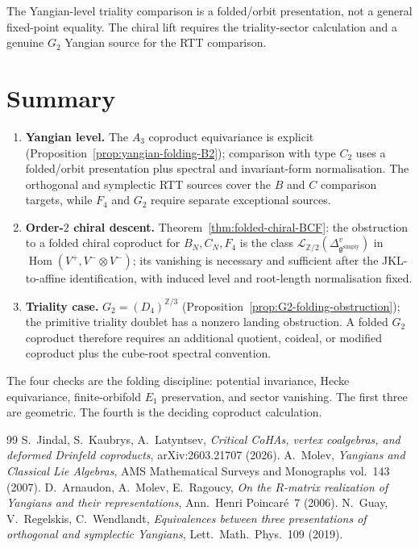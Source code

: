 \documentclass[11pt]{amsart}
\theoremstyle{definition}
\theoremstyle{remark}
\providecommand{\fg}{\mathfrak{g}}
\begin{document}
The Yangian-level triality comparison is a folded/orbit presentation,
not a general fixed-point equality. The chiral lift requires the
triality-sector calculation and a genuine $G_2$ Yangian source for
the RTT comparison.

\section{Summary}
\label{sec:summary-folding}

\begin{enumerate}[label=\textup{(\arabic*)}]
\item \textbf{Yangian level.} The $A_3$ coproduct equivariance is
  explicit (Proposition~\ref{prop:yangian-folding-B2}); comparison
  with type $C_2$ uses a folded/orbit presentation plus spectral and
  invariant-form normalisation. The orthogonal and symplectic RTT
  sources cover the $B$ and $C$ comparison targets, while $F_4$ and
  $G_2$ require separate exceptional sources.
\item \textbf{Order-$2$ chiral descent.}
  Theorem~\ref{thm:folded-chiral-BCF}: the obstruction to a folded
  chiral coproduct for $B_N, C_N, F_4$ is the class
  $\mathcal L_{\mathbb Z/2}(\Delta^v_{\fg^{\mathrm{simply}}})$ in
  $\operatorname{Hom}(V^+,V^-\otimes V^-)$; its vanishing is necessary
  and sufficient after the JKL-to-affine identification, with induced
  level and root-length normalisation fixed.
\item \textbf{Triality case.} $G_2 = (D_4)^{\mathbb{Z}/3}$
  (Proposition~\ref{prop:G2-folding-obstruction}); the primitive
  triality doublet has a nonzero landing obstruction. A folded
  $G_2$ coproduct therefore requires an additional quotient, coideal,
  or modified coproduct plus the cube-root spectral convention.
\end{enumerate}

The four checks are the folding discipline: potential invariance,
Hecke equivariance, finite-orbifold $E_1$ preservation, and sector
vanishing. The first three are geometric. The fourth is the deciding
coproduct calculation.

\begin{thebibliography}{99}
 S.~Jindal, S.~Kaubrys, A.~Latyntsev,
\emph{Critical CoHAs, vertex coalgebras, and deformed Drinfeld
coproducts}, arXiv:2603.21707 (2026).
 A.~Molev,
\emph{Yangians and Classical Lie Algebras}, AMS Mathematical Surveys
and Monographs vol.~143 (2007).
 D.~Arnaudon, A.~Molev, E.~Ragoucy,
\emph{On the $R$-matrix realization of Yangians and their
representations}, Ann.\ Henri Poincar\'e~7 (2006).
 N.~Guay, V.~Regelskis, C.~Wendlandt,
\emph{Equivalences between three presentations of orthogonal and
symplectic Yangians}, Lett.\ Math.\ Phys.\ 109 (2019).
\end{thebibliography}
\end{document}
